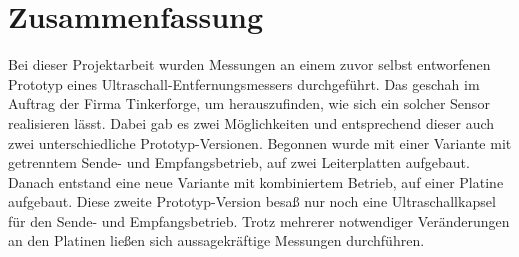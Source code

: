 \section{Zusammenfassung}
Bei dieser Projektarbeit wurden Messungen an einem zuvor selbst entworfenen Prototyp eines Ultraschall-Entfernungsmessers durchgeführt. Das geschah im Auftrag der Firma Tinkerforge, um herauszufinden, wie sich ein solcher Sensor realisieren lässt. Dabei gab es zwei Möglichkeiten und entsprechend dieser auch zwei unterschiedliche Prototyp-Versionen. Begonnen wurde mit einer Variante mit getrenntem Sende- und Empfangsbetrieb, auf zwei Leiterplatten aufgebaut. Danach entstand eine neue Variante mit kombiniertem Betrieb, auf einer Platine aufgebaut. Diese zweite Prototyp-Version besaß nur noch eine Ultraschallkapsel für den Sende- und Empfangsbetrieb. Trotz mehrerer notwendiger Veränderungen an den Platinen ließen sich aussagekräftige Messungen durchführen.